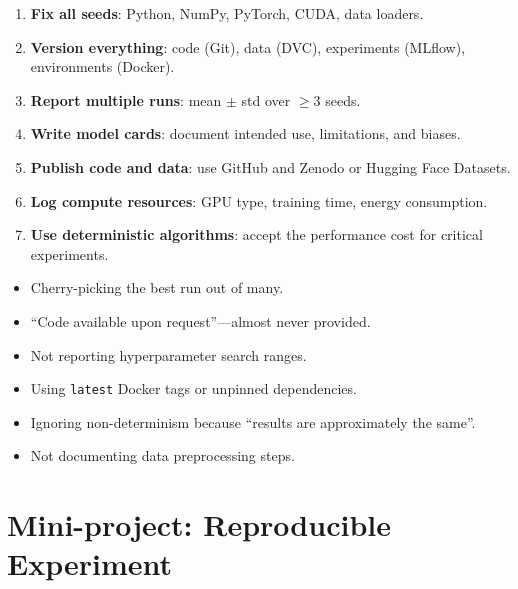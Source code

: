\begin{bestpractice}[title=\textbf{Reproducibility best practices}]
\begin{enumerate}
  \item \textbf{Fix all seeds}: Python, NumPy, PyTorch, CUDA, data
    loaders.
  \item \textbf{Version everything}: code (Git), data (DVC),
    experiments (MLflow), environments (Docker).
  \item \textbf{Report multiple runs}: mean $\pm$ std over $\geq 3$
    seeds.
  \item \textbf{Write model cards}: document intended use,
    limitations, and biases.
  \item \textbf{Publish code and data}: use GitHub and Zenodo or
    Hugging Face Datasets.
  \item \textbf{Log compute resources}: GPU type, training time,
    energy consumption.
  \item \textbf{Use deterministic algorithms}: accept the performance
    cost for critical experiments.
\end{enumerate}
\end{bestpractice}

\begin{antipattern}[title=\textbf{Reproducibility anti-patterns}]
\begin{itemize}
  \item Cherry-picking the best run out of many.
  \item ``Code available upon request''---almost never provided.
  \item Not reporting hyperparameter search ranges.
  \item Using \texttt{latest} Docker tags or unpinned dependencies.
  \item Ignoring non-determinism because ``results are approximately
    the same''.
  \item Not documenting data preprocessing steps.
\end{itemize}
\end{antipattern}

\section{Mini-project: Reproducible Experiment}
\label{sec:mini-project-ch11}

